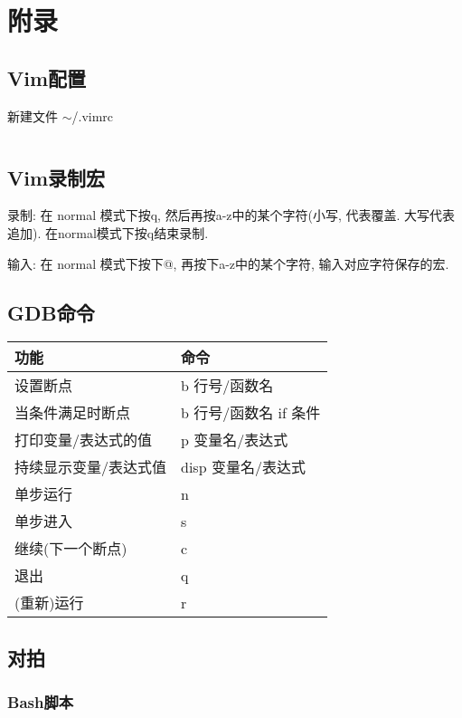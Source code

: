 \documentclass[utf8]{ctexart}
\begin{document}
\newpage

\section{附录}

\subsection{Vim配置}

新建文件 $\sim$/.vimrc

\inputminted[linenos,breaklines,tabsize=4,mathescape,texcl]{c}{codes/vimrc}

\subsection{Vim录制宏}

录制: 在 normal 模式下按q, 然后再按a-z中的某个字符(小写, 代表覆盖. 大写代表追加). 在normal模式下按q结束录制.

输入: 在 normal 模式下按下@, 再按下a-z中的某个字符, 输入对应字符保存的宏.

\subsection{GDB命令}

\begin{tabular}{ |l|l| }
	\hline
	\bfseries{功能}		& \bfseries{命令}		\\
	\hline
	设置断点				& b 行号/函数名			\\
	当条件满足时断点		& b 行号/函数名 if 条件	\\
	打印变量/表达式的值	& p 变量名/表达式			\\
	持续显示变量/表达式值	& disp 变量名/表达式		\\
	单步运行				& n						\\
	单步进入				& s						\\
	继续(下一个断点)		& c						\\
	退出					& q						\\
	(重新)运行			& r 					\\
	\hline
\end{tabular}

\subsection{对拍}

\subsubsection{Bash脚本}
\inputminted[linenos,breaklines,tabsize=4,mathescape,texcl]{sh}{codes/check-bash.sh}
\end{document}

